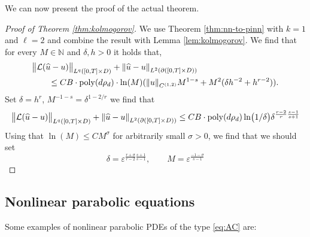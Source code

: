 \documentclass{article}
\numberwithin{equation}{section}
\newcommand{\poly}{\mathrm{poly}}
\newcommand{\N}{\mathbb{N}}
\newcommand{\cL}{\mathcal{L}}
\newcommand{\uhat}{{\widehat{u}}}
\renewcommand{\epsilon}{\varepsilon}
\newcommand{\1}{\mathbbm{1}}
\begin{document}
We can now present the proof of the actual theorem. 

\begin{proof}[Proof of Theorem \ref{thm:kolmogorov}]
We use Theorem \ref{thm:nn-to-pinn} with $k=1$ and $\ell=2$ and combine the result with Lemma \ref{lem:kolmogorov}. We find that for every $M\in\N$ and $\delta, h>0$ it holds that,
\begin{equation}
\begin{split}
     &\norm{\cL(\uhat-u)}_{L^q([0,T]\times D)} + \norm{\uhat-u}_{L^2(\partial([0,T]\times D))} \\
     &\qquad \leq CB\cdot \poly(d\rho_d)\cdot \ln(M)(\norm{u}_{C^{(1,2)}}M^{1-s}+M^{2}(\delta h^{-2}+h^{r-2})). 
\end{split}
\end{equation}
Set $\delta=h^r$, $M^{-1-s} = \delta^{1-2/r}$ we find that
\begin{equation}
    \norm{\cL(\uhat-u)}_{L^q([0,T]\times D)} + \norm{\uhat-u}_{L^2(\partial([0,T]\times D))} \leq CB\cdot \poly(d\rho_d) \ln(1/\delta) \delta^{\frac{r-2}{r}\frac{s-1}{s+1}}
\end{equation}
Using that $\ln(M)\leq CM^\sigma$ for arbitrarily small $\sigma>0$, we find that we should set
\begin{equation}
    \delta = \epsilon^{\frac{r+\sigma}{r-2}\frac{s+1}{s-1}},\qquad M = \epsilon^{\frac{-1-\sigma}{s-1}}
\end{equation}
\end{proof}

\subsection{Nonlinear parabolic equations}\label{app:sem-lin-par}

Some examples of nonlinear parabolic PDEs of the type \eqref{eq:AC} are:
\end{document}

